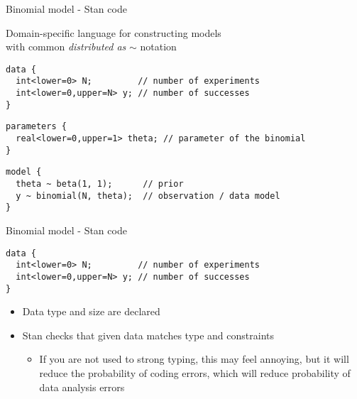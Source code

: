 \documentclass[finnish,english,t]{beamer}
\begin{document}
\begin{frame}[fragile]{Binomial model - Stan code}

  {Domain-specific language} for constructing models\\
  with common \textit{distributed as} $\sim$ notation


\small
{}  

{
\begin{verbatim}
data {
  int<lower=0> N;         // number of experiments
  int<lower=0,upper=N> y; // number of successes
}
\end{verbatim}
}

{
\begin{verbatim}
parameters {
  real<lower=0,upper=1> theta; // parameter of the binomial
}
\end{verbatim}
}
  
{
\begin{verbatim}
model {
  theta ~ beta(1, 1);      // prior
  y ~ binomial(N, theta);  // observation / data model
}
\end{verbatim}
}

\end{frame} 


\begin{frame}[fragile]{Binomial model - Stan code}
  
  {\small
  \begin{verbatim}
data {
  int<lower=0> N;         // number of experiments
  int<lower=0,upper=N> y; // number of successes
}
\end{verbatim}
  }

  \begin{itemize}
  \item Data type and size are declared
  \item Stan checks that given data matches type and constraints
    \begin{itemize}
    \item<2-> If you are not used to strong typing, this may
      feel annoying, but it will reduce the probability of coding
      errors, which will reduce probability of data analysis errors
    \end{itemize}
  \end{itemize}
\end{frame}
\end{document}
